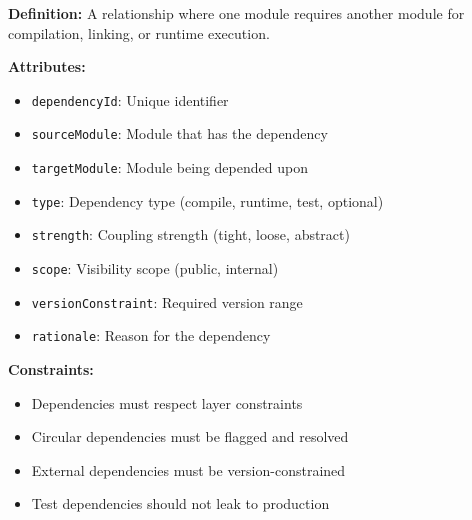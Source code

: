 \documentclass[11pt,letterpaper]{article}
\begin{document}
\begin{definitionbox}
\textbf{Definition:} A relationship where one module requires another module for compilation, linking, or runtime execution.

\textbf{Attributes:}
\begin{itemize}[nosep]
    \item \texttt{dependencyId}: Unique identifier
    \item \texttt{sourceModule}: Module that has the dependency
    \item \texttt{targetModule}: Module being depended upon
    \item \texttt{type}: Dependency type (compile, runtime, test, optional)
    \item \texttt{strength}: Coupling strength (tight, loose, abstract)
    \item \texttt{scope}: Visibility scope (public, internal)
    \item \texttt{versionConstraint}: Required version range
    \item \texttt{rationale}: Reason for the dependency
\end{itemize}

\textbf{Constraints:}
\begin{itemize}[nosep]
    \item Dependencies must respect layer constraints
    \item Circular dependencies must be flagged and resolved
    \item External dependencies must be version-constrained
    \item Test dependencies should not leak to production
\end{itemize}
\end{definitionbox}
\end{document}
